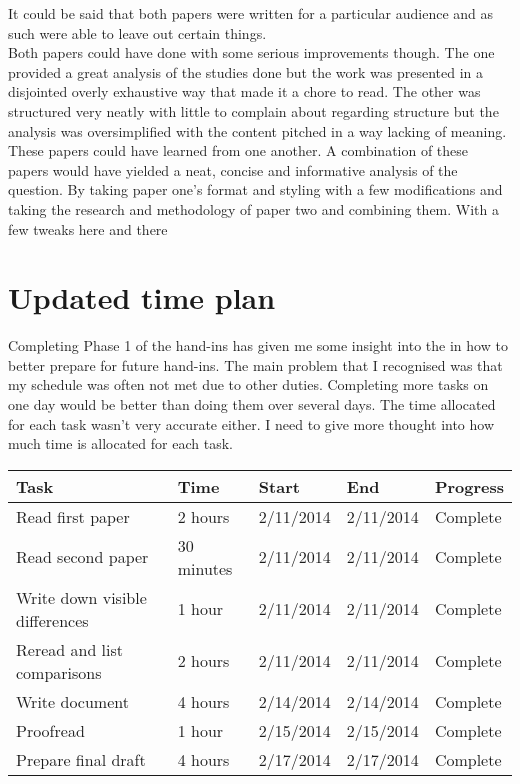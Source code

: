 \documentclass[11pt]{article}
\begin{document}
It could be said that both papers were written for a particular audience and as such were able to leave out certain things. 
\\

Both papers could have done with some serious improvements though. The one provided a great analysis of the studies done but the work was presented in a disjointed overly exhaustive way that made it a chore to read. The other was structured very neatly with little to complain about regarding structure but the analysis was oversimplified with the content pitched in a way lacking of meaning.
\\

These papers could have learned from one another. A combination of these papers would have yielded a neat, concise and informative analysis of the question. By taking paper one's format and styling with a few modifications and taking the research and methodology of paper two and combining them. With a few tweaks here and there

\clearpage

\clearpage
\section{Updated time plan}
Completing Phase 1 of the hand-ins has given me some insight into the in how to better prepare for future hand-ins. The main problem that I recognised was that my schedule was often not met due to other duties. Completing more tasks on one day would be better than doing them over several days. The time allocated for each task wasn't very accurate either. I need to give more thought into how much time is allocated for each task.
\\


\begin{center}
	\begin{tabular}{ | p{5cm} | p{2cm} | p{3cm} | p{3cm} | p{3cm} |}
		\hline
		Task & Time       & Start   & End & Progress \\ \hline 
		Read first paper  & 2 hours & 2/11/2014 & 2/11/2014 & Complete  \\ \hline 
		Read second paper & 30 minutes & 2/11/2014 & 2/11/2014 & Complete  \\ \hline 
		Write down visible differences & 1 hour & 2/11/2014 & 2/11/2014 & Complete  \\ \hline 
		Reread and list comparisons & 2 hours & 2/11/2014 & 2/11/2014 & Complete  \\ \hline 
		Write document& 4 hours & 2/14/2014 & 2/14/2014 & Complete  \\ \hline 
		Proofread & 1 hour & 2/15/2014 & 2/15/2014 & Complete  \\ \hline 
		Prepare final draft & 4 hours & 2/17/2014 & 2/17/2014 & Complete \\ \hline 
	\end{tabular}
\end{center}
\end{document}
